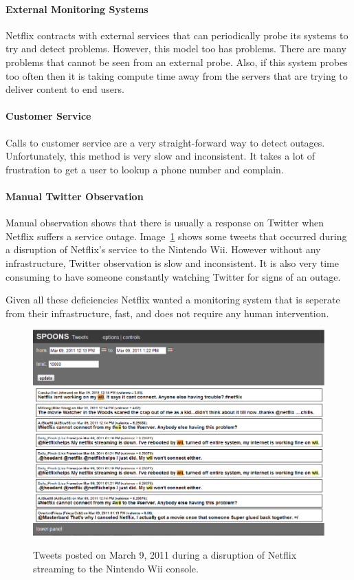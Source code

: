 \documentclass[12pt]{ucthesis}
\newcommand{\captionfonts}{\small\bf\ssp}
\begin{document}
\paragraph{External Monitoring Systems}
Netflix contracts with external services that can periodically probe its systems to try and detect problems.
However, this model too has problems. There are many problems that cannot be seen from an external probe.
Also, if this system probes too often then it is taking compute time away from the servers that are trying to deliver
content to end users.

\paragraph{Customer Service}
Calls to customer service are a very straight-forward way to detect outages.
Unfortunately, this method is very slow and inconsistent. It takes a lot of frustration to get a user to
lookup a phone number and complain.

\paragraph{Manual Twitter Observation}
Manual observation shows that there is usually a response on Twitter when Netflix suffers a service
outage. Image~\ref{fig:tweetEx} shows some tweets that occurred during a disruption of Netflix's service to
the Nintendo Wii. However without any infrastructure, Twitter observation is slow and inconsistent.
It is also very time consuming to have someone constantly watching Twitter for signs of an outage.

Given all these deficiencies Netflix wanted a monitoring system that is seperate from their infrastructure,
fast, and does not require any human intervention\cite{kevin}.

\begin{figure}
   \begin{center}
      \includegraphics[width=140mm]{images/tweetexample.eps}
      \captionfonts
      \caption[Outage Tweets Example]{Tweets posted on March 9, 2011 during a disruption of Netflix
                                       streaming to the Nintendo Wii console.}
      \label{fig:tweetEx}
   \end{center}
\end{figure}
\end{document}
